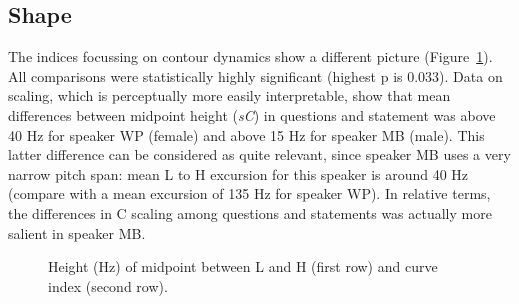\subsection{Shape}\label{sec233}
The indices focussing on contour dynamics show a different picture (Figure~\ref{fig208}). All comparisons were statistically highly significant (highest p is 0.033). Data on scaling, which is perceptually more easily interpretable, show that mean differences between midpoint height (\textit{sC}) in questions and statement was above 40 Hz for speaker WP (female) and above 15 Hz for speaker MB (male). This latter difference can be considered as quite relevant, since speaker MB uses a very narrow pitch span: mean L to H excursion for this speaker is around 40 Hz (compare with a mean excursion of 135 Hz for speaker WP). In relative terms, the differences in C scaling among questions and statements was actually more salient in speaker MB.

\begin{figure}
\centering
{}
\caption{Height (Hz) of midpoint between L and H (first row) and curve index (second row).}
\label{fig208}\end{figure}

